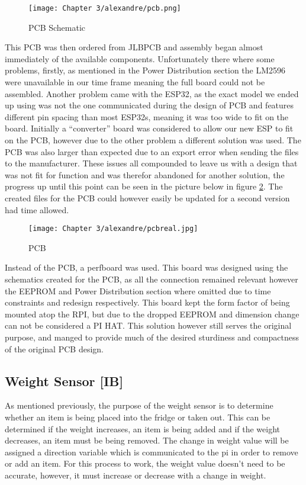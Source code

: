 \begin{figure}[H]        
    \centering
    \texttt{[image: Chapter 3/alexandre/pcb.png]}
    \caption{PCB Schematic}
    \label{fig:pcbs}
\end{figure} 

This PCB was then ordered from JLBPCB and assembly began almost immediately of the available components.
Unfortunately there where some problems, firstly, as mentioned in the Power Distribution section the LM2596 were unavailable in our time frame meaning the full board could not be assembled.
Another problem came with the ESP32, as the exact model we ended up using was not the one communicated during the design of PCB and features different pin spacing than most ESP32s, meaning it was too wide to fit on the board.
Initially a “converter” board was considered to allow our new ESP to fit on the PCB, however due to the other problem a different solution was used.
The PCB was also larger than expected due to an export error when sending the files to the manufacturer.
These issues all compounded to leave us with a design that was not fit for function and was therefor abandoned for another solution, the progress up until this point can be seen in the picture below in figure \ref{fig:realpcb}.
The created files for the PCB could however easily be updated for a second version had time allowed.

\begin{figure}[H]        
    \centering
    \texttt{[image: Chapter 3/alexandre/pcbreal.jpg]}
    \caption{PCB}
    \label{fig:realpcb}
\end{figure} 

Instead of the PCB, a perfboard was used.
This board was designed using the schematics created for the PCB, as all the connection remained relevant however the EEPROM and Power Distribution section where omitted due to time constraints and redesign respectively.
This board kept the form factor of being mounted atop the RPI, but due to the dropped EEPROM and dimension change can not be considered a PI HAT.
This solution however still serves the original purpose, and manged to provide much of the desired sturdiness and compactness of the original PCB design.


\subsection{Weight Sensor [IB]}

As mentioned previously, the purpose of the weight sensor is to determine whether an item is being placed into the fridge or taken out.
This can be determined if the weight increases, an item is being added and if the weight decreases, an item must be being removed.
The change in weight value will be assigned a direction variable which is communicated to the pi in order to remove or add an item.
For this process to work, the weight value doesn't need to be accurate, however, it must increase or decrease with a change in weight.

